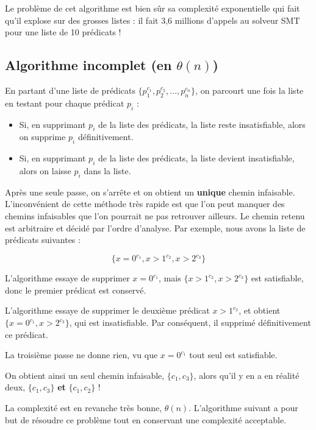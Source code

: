 \documentclass[french]{article}
\begin{document}
  Le problème de cet algorithme est bien sûr sa complexité exponentielle qui fait qu'il explose sur des grosses listes : il fait 3,6 millions d'appels au solveur SMT pour une liste de 10 prédicats !
  
  \subsection{Algorithme incomplet (en $\theta(n)$)}
  En partant d'une liste de prédicats $\{p_1^{c_1}, p_2^{c_2}, ..., p_n^{c_n}\}$, on parcourt une fois la liste en testant pour chaque prédicat $p_i$ :
  
  \begin{itemize}
   \item Si, en supprimant $p_i$ de la liste des prédicats, la liste reste insatisfiable, alors on supprime $p_i$ définitivement.
   \item Si, en supprimant $p_i$ de la liste des prédicats, la liste devient insatisfiable, alors on laisse $p_i$ dans la liste.
  \end{itemize}
  
  Après une seule passe, on s'arrête et on obtient un \textbf{unique} chemin infaisable. L'inconvénient de cette méthode très rapide est que l'on peut manquer des chemins infaisables que l'on pourrait ne pas retrouver ailleurs. Le chemin retenu est arbitraire et décidé par l'ordre d'analyse. Par exemple, nous avons la liste de prédicats suivantes :
  
  \[\{x = 0^{c_1}, x > 1^{c_2}, x > 2^{c_3}\}\]
  
  L'algorithme essaye de supprimer $x = 0^{c_1}$, mais $\{x > 1^{c_2}, x > 2^{c_3}\}$ est satisfiable, donc le premier prédicat est conservé.
  
  L'algorithme essaye de supprimer le deuxième prédicat $x > 1^{c_2}$, et obtient $\{x = 0^{c_1}, x > 2^{c_3}\}$, qui est insatisfiable. Par conséquent, il supprimé définitivement ce prédicat.
  
  La troisième passe ne donne rien, vu que ${x = 0^{c_1}}$ tout seul est satisfiable.
  
  On obtient ainsi un seul chemin infaisable, $\{c_1, c_3\}$, alors qu'il y en a en réalité deux, $\{c_1, c_3\}$ \textbf{et} $\{c_1, c_2\}$ !
  
  La complexité est en revanche très bonne, $\theta(n)$. L'algorithme suivant a pour but de résoudre ce problème tout en conservant une complexité acceptable.
  
  
\end{document}
